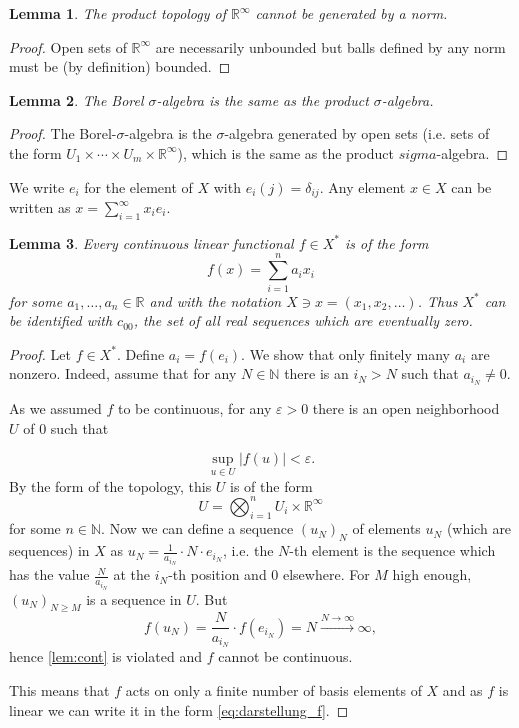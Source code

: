 \documentclass{scrartcl}
\newtheorem{lemma}{Lemma}
\theoremstyle{definition}
\theoremstyle{remark}
\newcommand{\eps}{\varepsilon}
\newcommand{\N}{\mathbb N}
\newcommand{\R}{\mathbb R}
\begin{document}
\begin{lemma}
The product topology of $\R^\infty$ cannot be generated by a norm. 
\end{lemma}
\begin{proof}
Open sets of $\R^\infty$ are necessarily unbounded but balls defined by any norm must be (by definition) bounded.
\end{proof}
\begin{lemma}
The Borel $\sigma$-algebra is the same as the product $\sigma$-algebra.
\end{lemma}
\begin{proof}
The Borel-$\sigma$-algebra is the $\sigma$-algebra generated by open sets (i.e. sets of the form $U_1\times\cdots\times U_m\times \R^\infty$), which is the same as the product $sigma$-algebra.
\end{proof}
We write $e_i$ for the element of $X$ with $e_i(j) = \delta_{ij}$. Any element $x\in X$ can be written as $x = \sum_{i=1}^\infty x_i e_i$.
\begin{lemma}\label{lem:Xstar}
Every continuous linear functional $f\in X^*$ is of the form 
\begin{equation}f(x) = \sum_{i=1}^n a_i x_i \label{eq:darstellung_f} \end{equation}
for some $a_1,\ldots, a_n\in\R$ and with the notation $X \ni x = (x_1, x_2,\ldots)$. Thus $X^*$ can be identified with $c_{00}$, the set of all real sequences which are eventually zero.
\end{lemma}
\begin{proof}
Let $f\in X^*$. Define $a_i = f(e_i)$. We show that only finitely many $a_i$ are nonzero. Indeed, assume that for any $N\in \N$ there is an $i_N > N$ such that $a_{i_N} \neq 0$.

As we assumed $f$ to be continuous, for any $\eps > 0$ there is an open neighborhood $U$ of $0$ such that

 \begin{equation}
\sup_{u\in U} |f(u)| < \eps.  \label{lem:cont}
 \end{equation} 
 By the form of the topology, this $U$ is of the form
\[ U =  \bigotimes_{i=1}^n U_i \times \R^\infty \]
for some $n\in \N$. Now we can define a sequence $(u_N)_N$ of elements $u_N$ (which are sequences) in $X$ as $u_N = \frac{1}{a_{i_N}}\cdot N\cdot e_{i_N }$, i.e. the $N$-th element is the sequence which has the value $\frac{N}{a_{i_N}}$ at the $i_N$-th position and $0$ elsewhere. For $M$ high enough, $(u_N)_{N\geq M}$ is a sequence in $U$. But
\[ f(u_N) = \frac{N}{a_{i_N}}\cdot f(e_{i_N}) = N \xrightarrow{N\to\infty} \infty,\]
hence \eqref{lem:cont} is violated and $f$ cannot be continuous.

This means that $f$ acts on only a finite number of basis elements of $X$ and as $f$ is linear we can write it in the form \eqref{eq:darstellung_f}.
\end{proof}
\end{document}
